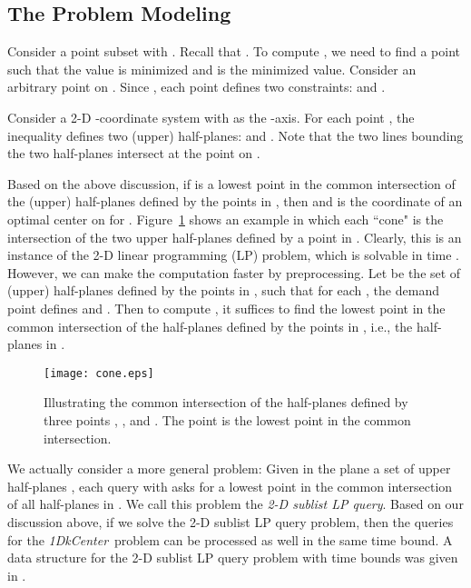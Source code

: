\documentclass{llncs}
\def\problem{{\it 1DkCenter}}
\def\sectionspace{\vspace*{-0.10in}}
\begin{document}
\sectionspace
\subsection{The Problem Modeling}

Consider a point subset  with . Recall that
. To compute , we
need to find a point  such that the value  is minimized and
 is the minimized value.
Consider an arbitrary point  on .
Since , each point
 defines two constraints:
 and
.

Consider a 2-D -coordinate system with  as the -axis. For each
point , the inequality  defines
two (upper) half-planes:  and .  Note that the two lines bounding the two half-planes
intersect at the point  on .

Based on the above discussion, if  is a lowest point in
the common intersection of the  (upper) half-planes defined by the
points in , then  and  is the
coordinate of an optimal center  on  for . Figure~\ref{fig:cone}
shows an example in which each ``cone" is the intersection of
the two upper half-planes defined by a point in .
Clearly, this is an
instance of the 2-D linear programming (LP) problem, which is solvable
in  time \cite{ref:DyerLi84,ref:MegiddoLi84}. However, we
can make the computation faster by preprocessing. Let
 be the set of  (upper) half-planes defined by
the  points in , such that for each , the demand point
 defines  and . Then to compute
, it suffices to find the lowest point  in the
common intersection of the half-planes defined by the points in
, i.e., the half-planes in
.

\begin{figure}[t]
\begin{minipage}[t]{\linewidth}
\begin{center}
\texttt{[image: cone.eps]}
\caption{\footnotesize Illustrating the common intersection of the
half-planes defined by three points , , and . The
point  is the lowest point in the common
intersection.}\label{fig:cone}
\end{center}
\end{minipage}
\vspace*{-0.15in}
\end{figure}


We actually consider a more general problem: Given in the plane
a set of  upper half-planes , each
query  with  asks for a lowest point
 in the common intersection of all half-planes in
. We call this problem the {\em
2-D sublist LP query}. Based on our discussion above,
if we solve the 2-D sublist LP query problem, then the
 queries for the \problem\ problem can be processed as well in the
same time bound.
A data structure for the 2-D sublist LP query problem with time bounds  was given in \cite{ref:ChenAp091}.
\end{document}
